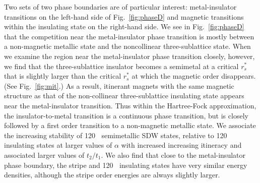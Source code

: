 \documentclass[%
 reprint,
 superscriptaddress,
 amsmath,amssymb,
 aps,
 prx,
 floatfix,
]{revtex4-2}
\newcommand{\<}{\langle}
\renewcommand{\>}{\rangle}
\renewcommand{\(}{\left(}
\renewcommand{\)}{\right)}
\renewcommand{\[}{\left[}
\renewcommand{\]}{\right]}
\DeclareMathOperator{\degree}{^{\circ}}
\begin{document}
Two sets of two phase boundaries are of particular interest: metal-insulator transitions on the left-hand side of 
Fig.~\ref{fig:phaseD} and magnetic transitions within the insulating state on the right-hand side.
We see in Fig.~\ref{fig:phaseD} that the competition near the metal-insulator phase transition
is mostly between a non-magnetic metallic state and the noncollinear three-sublattice 
state.  When we examine the region near the metal-insulator phase transition closely, however,
we find that the three-sublattice insulator becomes a semimetal at a critical $r_s^*$ that is slightly larger than the critical $r_s^*$ 
at which the magnetic order disappears. (See Fig.~\ref{fig:mit}.)
As a result, itinerant magnets with the same magnetic structure as that of the non-collinear three-sublattice insulating state
appears near the metal-insulator transition.  
Thus within the Hartree-Fock approximation, the insulator-to-metal transition is a continuous phase transition, but is closely followed by a first order transition to 
a non-magnetic metallic state.  
We associate the increasing stability of 120$\degree$ semimetallic SDW states, relative to 120$\degree$ insulating 
states at larger values of $\alpha$ with increased increasing itineracy and associated larger values of  
$t_2/t_1$.  We also find that close to the metal-insulator phase boundary, the stripe and 120$\degree$ insulating states have 
very similar energy densities, although the stripe order energies are always slightly larger. 
\end{document}
